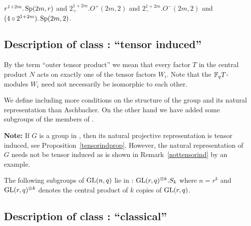 $r^{1+2m}.\Sp(2m,r)$ and $2_+^{1+2m}.O^+(2m,2)$ and 
$2_-^{1+2m}.O^-(2m,2)$ and $(4 \circ 2^{1+2m}).\Sp(2m,2)$.


\subsection{Description of class : ``tensor induced''}
\label{descD7}


By the term ``outer tensor product'' we mean that every factor
$T$ in the central product $N$ acts on exactly one of the tensor factors $W_i$.
Note that the $\mathbb{F}_q T$-modules $W_i$ need not necessarily be
isomorphic to each other.

\medskip
{} 
We define  including more conditions on the structure of the group
and its natural representation than Aschbacher. On the other hand we
have added some subgroups of the members of .

\smallskip
\textbf{Note:} 
If $G$ is a
group in , then its natural projective representation
is tensor induced,
see Proposition~\ref{tensorindprop}. However, the natural
representation of $G$ needs not be tensor induced as is shown in
Remark~\ref{nottensorind} by an example.

\smallskip
\exmemb
The following subgroups of $\GL(n,q)$ lie in :
$\GL(r,q)^{\otimes k}.S_k$ where $n=r^k$ and $\GL(r,q)^{\otimes k}$ 
denotes the central product of $k$ copies of $\GL(r,q)$.

\subsection{Description of class : ``classical''}
\label{descD8}

